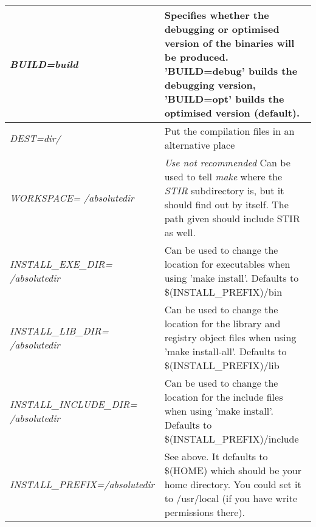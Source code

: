 \documentclass{article}
\begin{document}
\begin{longtable}{|p{\MakeTableFirstCol}|p{\MakeTableSecondCol}|}
\hline

{\raggedright
\textit{BUILD=build}} & 

{\raggedright
Specifies whether the debugging or optimised version of the 
binaries will be produced. 'BUILD=debug' builds the debugging 
version, 'BUILD=opt' builds the optimised version (default).} \\
\hline

{\raggedright
\textit{DEST=dir/}} & 

{\raggedright
Put the compilation files in an alternative place} \\
\hline

{\raggedright
\textit{WORKSPACE= \linebreak
/absolutedir}} & 

{\raggedright
\textit{Use not recommended} \linebreak
Can be used to tell \textit{make} where the \textit{STIR} subdirectory is, 
but it should find out by itself. The path given should include 
STIR as well.} \\
\hline

{\raggedright
\textit{INSTALL\_EXE\_DIR= \linebreak
/absolutedir}} & 

{\raggedright
Can be used to change the location for executables when using 
'make install'. Defaults to \$(INSTALL\_PREFIX)/bin} \\
\hline

{\raggedright
\textit{INSTALL\_LIB\_DIR= \linebreak
/absolutedir}} & 

{\raggedright
Can be used to change the location for the library and registry 
object files when using 'make install-all'. Defaults to \$(INSTALL\_PREFIX)/lib} \\
\hline

{\raggedright
\textit{INSTALL\_INCLUDE\_DIR= \linebreak
/absolutedir}} & 

{\raggedright
Can be used to change the location for the include files when 
using 'make install'. Defaults to \$(INSTALL\_PREFIX)/include} \\
\hline

{\raggedright
\textit{INSTALL\_PREFIX=/absolutedir}} & 

{\raggedright
See above. It defaults to \$(HOME) which should be your home 
directory. You could set it to /usr/local (if you have write 
permissions there).} \\
\hline


\end{longtable}
\end{document}

